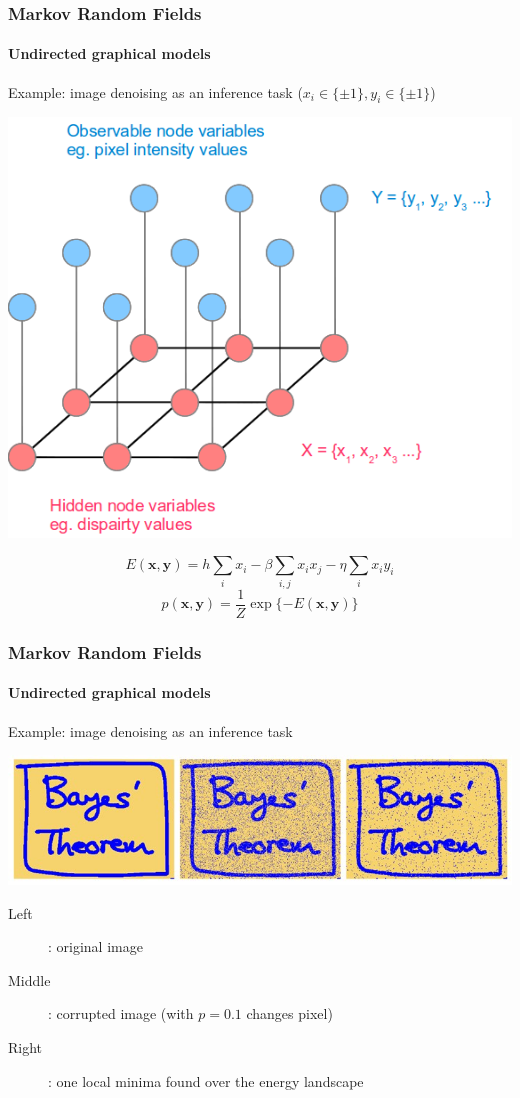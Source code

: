 \documentclass[slidestop,compress,mathserif]{beamer}
\begin{document}
 \begin{frame}
 	\frametitle{Markov Random Fields}
 	\framesubtitle{Undirected graphical models}
     Example: image denoising as an inference task ($x_i\in\{\pm 1\}, y_i\in\{\pm 1\}$)
      \begin{center}
     \includegraphics[width=.4\textwidth]{MRFWEB}
     \end{center}
     $$E(\mathbf{x},\mathbf{y}) = h\sum_i x_i - \beta\sum_{i,j}x_ix_j - \eta\sum_i x_iy_i$$
     $$p(\mathbf{x},\mathbf{y}) = \frac{1}{Z}\exp\{-E(\mathbf{x},\mathbf{y})\}$$
 \end{frame} 
 
 
 \begin{frame}
 	\frametitle{Markov Random Fields}
 	\framesubtitle{Undirected graphical models}
     Example: image denoising as an inference task
      \begin{center}
     \includegraphics[width=\textwidth]{img49.jpg}
        \begin{description}
    \item[Left]: original image
    \item[Middle]: corrupted image (with $p=0.1$ changes pixel)
    \item[Right]: one local minima found over the energy landscape
    \end{description}

     \end{center}
 \end{frame} 
\end{document}
